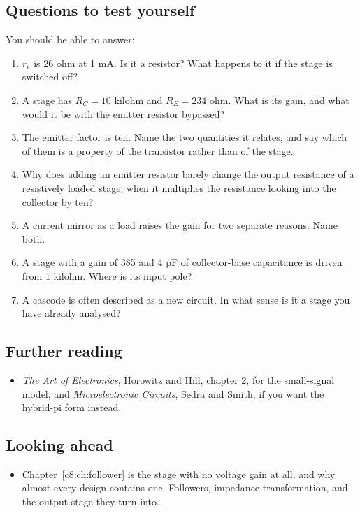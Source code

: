 \subsection*{Questions to test yourself}
You should be able to answer:
\begin{enumerate}
  \item $r_e$ is 26 ohm at 1 mA. Is it a resistor? What happens to it if the stage is switched off?
  \item A stage has $R_C = 10$ kilohm and $R_E = 234$ ohm. What is its gain, and what would it be with the emitter resistor bypassed?
  \item The emitter factor is ten. Name the two quantities it relates, and say which of them is a property of the transistor rather than of the stage.
  \item Why does adding an emitter resistor barely change the output resistance of a resistively loaded stage, when it multiplies the resistance looking into the collector by ten?
  \item A current mirror as a load raises the gain for two separate reasons. Name both.
  \item A stage with a gain of 385 and 4 pF of collector-base capacitance is driven from 1 kilohm. Where is its input pole?
  \item A cascode is often described as a new circuit. In what sense is it a stage you have already analysed?
\end{enumerate}

\subsection*{Further reading}
\begin{itemize}
  \item \emph{The Art of Electronics}, Horowitz and Hill, chapter 2, for the small-signal model, and \emph{Microelectronic Circuits}, Sedra and Smith, if you want the hybrid-pi form instead.
\end{itemize}

\subsection*{Looking ahead}
\begin{itemize}
  \item Chapter~\ref{c8:ch:follower} is the stage with no voltage gain at all, and why almost every design contains one. Followers, impedance transformation, and the output stage they turn into.
\end{itemize}
